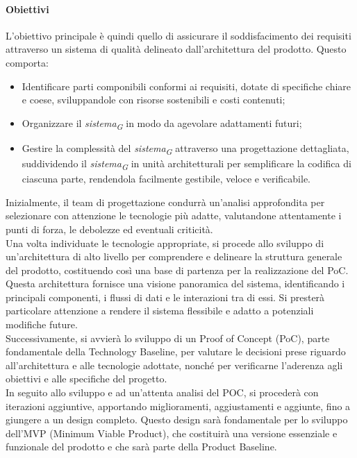 \paragraph{Obiettivi}
L'obiettivo principale è quindi quello di assicurare il soddisfacimento dei requisiti attraverso un sistema di qualità delineato dall'architettura del prodotto. Questo comporta:
\begin{itemize}
    \item Identificare parti componibili conformi ai requisiti, dotate di specifiche chiare e coese, sviluppandole con risorse sostenibili e costi contenuti;
    \item Organizzare il \textit{sistema}\textsubscript{\textit{G}} in modo da agevolare adattamenti futuri;
    \item Gestire la complessità del \textit{sistema}\textsubscript{\textit{G}} attraverso una progettazione dettagliata, suddividendo il \textit{sistema}\textsubscript{\textit{G}} in unità architetturali per semplificare la codifica di ciascuna parte, rendendola facilmente gestibile, veloce e verificabile.
\end{itemize}
Inizialmente, il team di progettazione condurrà un'analisi approfondita per selezionare con attenzione le tecnologie più adatte, valutandone attentamente i punti di forza, le debolezze ed eventuali criticità. \\
Una volta individuate le tecnologie appropriate, si procede allo sviluppo di un'architettura di alto livello per comprendere e delineare la struttura generale del prodotto, costituendo così una base di partenza per la realizzazione del PoC.
Questa architettura fornisce una visione panoramica del sistema, identificando i principali componenti, i flussi di dati e le interazioni tra di essi. Si presterà particolare attenzione a rendere il sistema flessibile e adatto a potenziali modifiche future. \\
Successivamente, si avvierà lo sviluppo di un Proof of Concept (PoC), parte fondamentale della Technology Baseline, per valutare le decisioni prese riguardo all'architettura e alle tecnologie adottate, nonché per verificarne l'aderenza agli obiettivi e alle specifiche del progetto. \\
In seguito allo sviluppo e ad un'attenta analisi del POC, si procederà con iterazioni aggiuntive, apportando miglioramenti, aggiustamenti e aggiunte, fino a giungere a un design completo. Questo design sarà fondamentale per lo sviluppo dell'MVP (Minimum Viable Product), che costituirà una versione essenziale e funzionale del prodotto e che sarà parte della Product Baseline.

